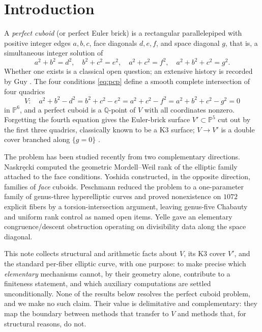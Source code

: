 \documentclass[11pt,reqno]{amsart}
\theoremstyle{plain}
\theoremstyle{definition}
\theoremstyle{remark}
\newcommand{\Q}{\mathbb{Q}}
\newcommand{\PP}{\mathbb{P}}
\begin{document}
\section{Introduction}\label{sec:intro}

A \emph{perfect cuboid} (or perfect Euler brick) is a rectangular parallelepiped
with positive integer edges $a,b,c$, face diagonals $d,e,f$, and space diagonal
$g$, that is, a simultaneous integer solution of
\begin{equation}\label{eq:pcp}
a^2+b^2=d^2,\quad b^2+c^2=e^2,\quad a^2+c^2=f^2,\quad a^2+b^2+c^2=g^2 .
\end{equation}
Whether one exists is a classical open question; an extensive history is recorded
by Guy \cite{Guy}. The four conditions \eqref{eq:pcp} define a smooth complete
intersection of four quadrics
\[
V:\quad a^2+b^2-d^2=b^2+c^2-e^2=a^2+c^2-f^2=a^2+b^2+c^2-g^2=0
\]
in $\PP^6$, and a perfect cuboid is a $\Q$-point of $V$ with all coordinates
nonzero. Forgetting the fourth equation gives the Euler-brick surface
$V'\subset\PP^5$ cut out by the first three quadrics, classically known to be a K3
surface; $V\to V'$ is a double cover branched along $\{g=0\}$ \cite{vanLuijk}.

The problem has been studied recently from two complementary directions. Naskr\k{e}cki
\cite{Naskrecki} computed the geometric Mordell--Weil rank of the elliptic family
attached to the face conditions. Yoshida \cite{Yoshida} constructed, in the opposite
direction, families of \emph{face} cuboids. Peschmann \cite{Peschmann1,Peschmann2}
reduced the problem to a one-parameter family of genus-three hyperelliptic curves and
proved nonexistence on $1072$ explicit fibers by a torsion-intersection argument,
leaving genus-five Chabauty and uniform rank control as named open items. Yelle
\cite{Yelle} gave an elementary congruence/descent obstruction operating on
divisibility data along the space diagonal.

This note collects structural and arithmetic facts about $V$, its K3 cover $V'$, and
the standard per-fiber elliptic curve, with one purpose: to make precise which
\emph{elementary} mechanisms cannot, by their geometry alone, contribute to a
finiteness statement, and which auxiliary computations are settled unconditionally.
None of the results below resolves the perfect cuboid problem, and we make no such
claim. Their value is delimitative and complementary: they map the boundary between
methods that transfer to $V$ and methods that, for structural reasons, do not.
\end{document}
